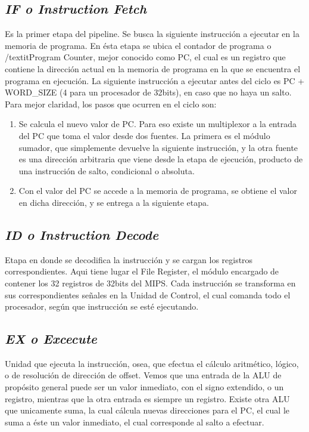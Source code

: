 \documentclass[12pt]{article}
\begin{document}
\subsection{\textit{IF o Instruction Fetch}} 
Es la primer etapa del pipeline. Se busca la siguiente instrucción a ejecutar en la memoria de programa. En ésta etapa se ubica el contador de programa o /textit{Program Counter}, mejor conocido como PC, el cual es un registro que contiene la dirección actual en la memoria de programa en la que se encuentra el programa en ejecución. La siguiente instrucción a ejecutar antes del ciclo es PC + WORD\_SIZE (4 para un procesador de 32bits), en caso que no haya un salto. Para mejor claridad, los pasos que ocurren en el ciclo son:

\begin{enumerate}
    \item Se calcula el nuevo valor de PC. Para eso existe un multiplexor a la entrada del PC que toma el valor desde dos fuentes. La primera es el módulo sumador, que simplemente devuelve la siguiente instrucción, y la otra fuente es una dirección arbitraria que viene desde la etapa de ejecución, producto de una instrucción de salto, condicional o absoluta.
    \item Con el valor del PC se accede a la memoria de programa, se obtiene el valor en dicha dirección, y se entrega a la siguiente etapa.
\end{enumerate}

\subsection{\textit{ID o Instruction Decode}} 
Etapa en donde se decodifica la instrucción y se cargan los registros correspondientes. Aqui tiene lugar el File Register, el módulo encargado de contener los 32 registros de 32bits del MIPS. Cada instrucción se transforma en sus correspondientes señales en la Unidad de Control, el cual comanda todo el procesador, según que instrucción se esté ejecutando. 

\subsection{\textit{EX o Excecute}} 
Unidad que ejecuta la instrucción, osea, que efectua el cálculo aritmético, lógico, o de resolución de dirección de offset. Vemos que una entrada de la ALU de propósito general puede ser un valor inmediato, con el signo extendido, o un registro, mientras que la otra entrada es siempre un registro. Existe otra ALU que unicamente suma, la cual cálcula nuevas direcciones para el PC, el cual le suma a éste un valor inmediato, el cual corresponde al salto a efectuar.
\end{document}
